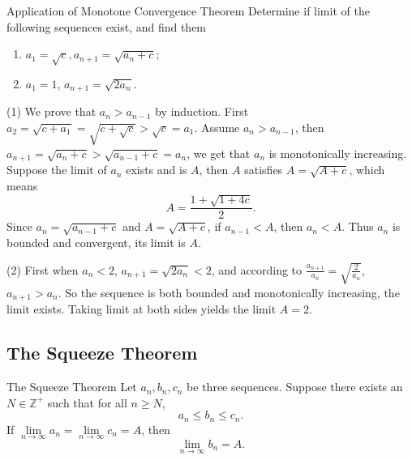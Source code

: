 \begin{example}{Application of Monotone Convergence Theorem}{}
  Determine if limit of the following sequences exist, and find them
  \begin{enumerate}
  \item $a_1 = \sqrt{c}, a_{n+1} = \sqrt{a_n + c}$;
  \item $a_1 = 1$, $a_{n+1} = \sqrt{2a_n}$.
  \end{enumerate}
\end{example}

\begin{solution}
  (1) We prove that $a_n > a_{n-1}$ by induction.
  First $a_2 = \sqrt{c + a_1} = \sqrt{c + \sqrt{c}} > \sqrt{c} = a_1$.
  Assume $a_n > a_{n-1}$, then $a_{n+1} = \sqrt{a_n + c} > \sqrt{a_{n-1} + c} =
  a_n$, we get that $a_n$ is monotonically increasing.
  Suppose the limit of $a_n$ exists and is $A$, then $A$ satisfies $A = \sqrt{A
    + c}$, which means
  \begin{equation}
    A = \frac{1 + \sqrt{1 + 4c}}{2}.
  \end{equation}
  Since $a_n = \sqrt{a_{n-1} + c}$ and $A = \sqrt{A + c}$, if $a_{n-1} < A$,
  then $a_n < A$.
  Thus $a_n$ is bounded and convergent, its limit is $A$.

  (2) First when $a_n < 2$, $a_{n+1} = \sqrt{2a_n} < 2$,
  and according to $\frac{a_{n+1}}{a_n} = \sqrt{\frac{2}{a_n}}$,
  $a_{n+1} > a_n$. So the sequence is both bounded and monotonically increasing,
  the limit exists. Taking limit at both sides yields the limit $A = 2$.
\end{solution}

\subsection{The Squeeze Theorem}

\begin{theorem}{The Squeeze Theorem}{}
  Let $a_n, b_n, c_n$ be three sequences.
  Suppose there exists an $N \in \mathbb{Z}^+$ such that for all $n \geq N$,
  \begin{equation}
    a_n \leq b_n \leq c_n.
  \end{equation}
  If $\lim \limits _{n \rightarrow \infty} a_n = \lim \limits _{n \rightarrow
    \infty} c_n = A$,
  then 
  \begin{equation}
    \lim \limits _{n \rightarrow \infty} b_n = A.
  \end{equation}
\end{theorem}

